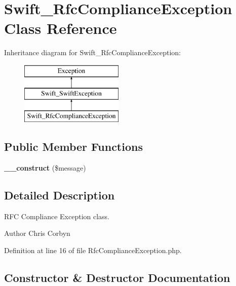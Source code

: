\section{Swift\+\_\+\+Rfc\+Compliance\+Exception Class Reference}
\label{class_swift___rfc_compliance_exception}
Inheritance diagram for Swift\+\_\+\+Rfc\+Compliance\+Exception\+:\begin{figure}[H]
\begin{center}
\leavevmode
\includegraphics[height=3.000000cm]{class_swift___rfc_compliance_exception}
\end{center}
\end{figure}
\subsection*{Public Member Functions}
\begin{DoxyCompactItemize}
\item 
{\bf \+\_\+\+\_\+construct} (\$message)
\end{DoxyCompactItemize}


\subsection{Detailed Description}
R\+F\+C Compliance Exception class.

\begin{DoxyAuthor}{Author}
Chris Corbyn 
\end{DoxyAuthor}


Definition at line 16 of file Rfc\+Compliance\+Exception.\+php.



\subsection{Constructor \& Destructor Documentation}

